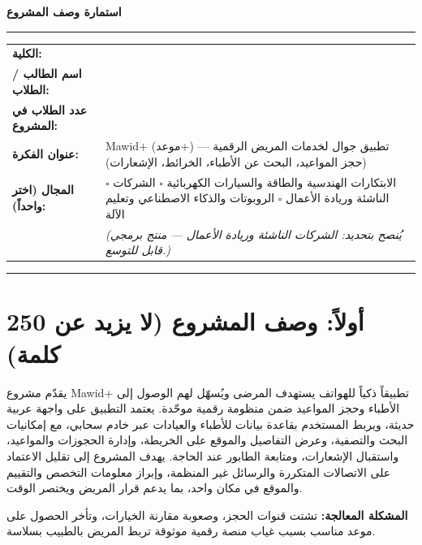 \documentclass[12pt,a4paper]{article}
\newcommand{\en}[1]{\foreignlanguage{english}{#1}}
\begin{document}
\thispagestyle{empty}
\begin{center}
{\LARGE\bfseries استمارة وصف المشروع}\\[1.2em]
\rule{\textwidth}{0.6pt}
\end{center}

\vspace{1em}

\noindent
\begin{tabular}{@{}p{}@{}p{}@{}}
\textbf{الكلية:} & \underline{\hspace{0.55\textwidth}} \\[0.9em]
\textbf{اسم الطالب / الطلاب:} & \underline{\hspace{0.55\textwidth}} \\[0.9em]
\textbf{عدد الطلاب في المشروع:} & \underline{\hspace{0.55\textwidth}} \\[0.9em]
\textbf{عنوان الفكرة:} &
\en{Mawid+} (موعد+) — تطبيق جوال لخدمات المريض الرقمية (حجز المواعيد، البحث عن الأطباء، الخرائط، الإشعارات) \\[0.9em]
\textbf{المجال (اختر واحداً):} &
$\square$ الابتكارات الهندسية والطاقة والسيارات الكهربائية \quad
$\square$ الشركات الناشئة وريادة الأعمال \quad
$\square$ الروبوتات والذكاء الاصطناعي وتعليم الآلة
\\[0.3em]
& \textit{(يُنصح بتحديد: الشركات الناشئة وريادة الأعمال — منتج برمجي قابل للتوسع.)}
\end{tabular}

\vspace{1.2em}
\rule{\textwidth}{0.4pt}
\section*{أولاً: وصف المشروع (لا يزيد عن 250 كلمة)}

يقدّم مشروع \en{Mawid+} تطبيقاً ذكياً للهواتف يستهدف المرضى ويُسهّل لهم الوصول إلى الأطباء وحجز المواعيد ضمن منظومة رقمية موحّدة. يعتمد التطبيق على واجهة عربية حديثة، ويربط المستخدم بقاعدة بيانات للأطباء والعيادات عبر خادم سحابي، مع إمكانيات البحث والتصفية، وعرض التفاصيل والموقع على الخريطة، وإدارة الحجوزات والمواعيد، واستقبال الإشعارات، ومتابعة الطابور عند الحاجة. يهدف المشروع إلى تقليل الاعتماد على الاتصالات المتكررة والرسائل غير المنظمة، وإبراز معلومات التخصص والتقييم والموقع في مكان واحد، بما يدعم قرار المريض ويختصر الوقت.

\textbf{المشكلة المعالجة:} تشتت قنوات الحجز، وصعوبة مقارنة الخيارات، وتأخر الحصول على موعد مناسب بسبب غياب منصة رقمية موثوقة تربط المريض بالطبيب بسلاسة.
\end{document}
